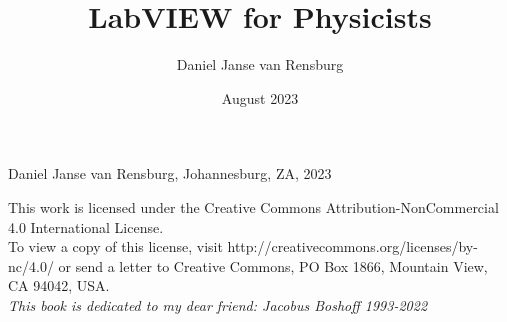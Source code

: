 \documentclass[a4paper,12pt]{book}
\begin{document}
\author{Daniel Janse van Rensburg}
\title{LabVIEW for Physicists}
\date{August 2023}

\frontmatter
\maketitle
\begin{center}
\textcopyright Daniel Janse van Rensburg, Johannesburg, ZA, 2023
\end{center}
\vfill
This work is licensed under the Creative Commons Attribution-NonCommercial 4.0 International License.\\ To view a copy of this license, visit http://creativecommons.org/licenses/by-nc/4.0/ or send a letter to Creative Commons, PO Box 1866, Mountain View, CA 94042, USA.\\
\newpage
\textit{This book is dedicated to my dear friend: Jacobus Boshoff 1993-2022}
\tableofcontents


\mainmatter





\backmatter
\end{document}
